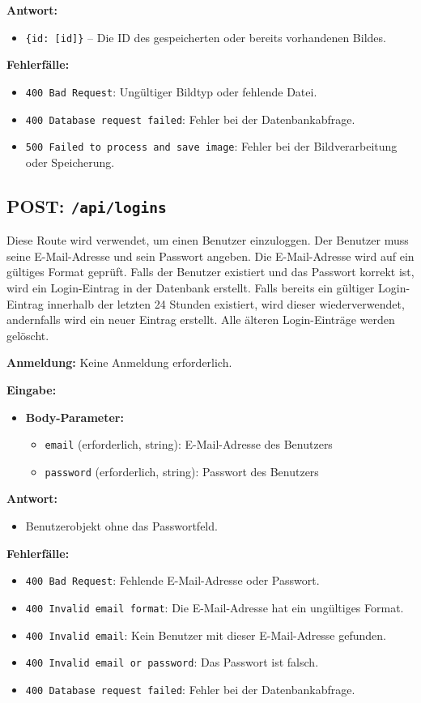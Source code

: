 \documentclass[a4paper,12pt]{article}
\begin{document}
\textbf{Antwort:}
\begin{itemize}
    \item \texttt{\{id: [id]\}} – Die ID des gespeicherten oder bereits vorhandenen Bildes.
\end{itemize}

\textbf{Fehlerfälle:}
\begin{itemize}
    \item \texttt{400 Bad Request}: Ungültiger Bildtyp oder fehlende Datei.
    \item \texttt{400 Database request failed}: Fehler bei der Datenbankabfrage.
    \item \texttt{500 Failed to process and save image}: Fehler bei der Bildverarbeitung oder Speicherung.
\end{itemize}

\newpage
\subsection{POST: \texttt{/api/logins}}

Diese Route wird verwendet, um einen Benutzer einzuloggen. Der Benutzer muss seine E-Mail-Adresse und sein Passwort angeben. Die E-Mail-Adresse wird auf ein gültiges Format geprüft. Falls der Benutzer existiert und das Passwort korrekt ist, wird ein Login-Eintrag in der Datenbank erstellt. Falls bereits ein gültiger Login-Eintrag innerhalb der letzten 24 Stunden existiert, wird dieser wiederverwendet, andernfalls wird ein neuer Eintrag erstellt. Alle älteren Login-Einträge werden gelöscht.

\textbf{Anmeldung:} Keine Anmeldung erforderlich.

\textbf{Eingabe:}
\begin{itemize}
    \item \textbf{Body-Parameter:}
    \begin{itemize}
        \item \texttt{email} (erforderlich, string): E-Mail-Adresse des Benutzers
        \item \texttt{password} (erforderlich, string): Passwort des Benutzers
    \end{itemize}
\end{itemize}

\textbf{Antwort:}
\begin{itemize}
    \item Benutzerobjekt ohne das Passwortfeld.
\end{itemize}

\textbf{Fehlerfälle:}
\begin{itemize}
    \item \texttt{400 Bad Request}: Fehlende E-Mail-Adresse oder Passwort.
    \item \texttt{400 Invalid email format}: Die E-Mail-Adresse hat ein ungültiges Format.
    \item \texttt{400 Invalid email}: Kein Benutzer mit dieser E-Mail-Adresse gefunden.
    \item \texttt{400 Invalid email or password}: Das Passwort ist falsch.
    \item \texttt{400 Database request failed}: Fehler bei der Datenbankabfrage.
\end{itemize}
\end{document}
